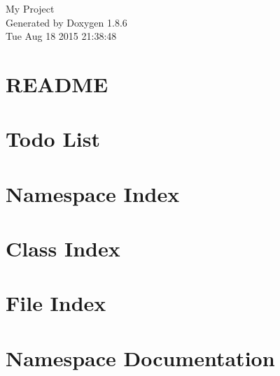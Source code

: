 \documentclass[twoside]{book}
\newcommand{\clearemptydoublepage}{%
  \newpage{\pagestyle{empty}\cleardoublepage}%
}
\begin{document}
\hypersetup{pageanchor=false}
\begin{titlepage}
\vspace*{7cm}
\begin{center}%
{\Large My Project }\\
\vspace*{1cm}
{\large Generated by Doxygen 1.8.6}\\
\vspace*{0.5cm}
{\small Tue Aug 18 2015 21:38:48}\\
\end{center}
\end{titlepage}
\clearemptydoublepage
\tableofcontents
\clearemptydoublepage
{}
\hypersetup{pageanchor=true}

\chapter{R\-E\-A\-D\-M\-E}
\label{md_README}
\hypertarget{md_README}{}

\chapter{Todo List}
\label{todo}
\hypertarget{todo}{}

\chapter{Namespace Index}

\chapter{Class Index}

\chapter{File Index}

\chapter{Namespace Documentation}

\end{document}
